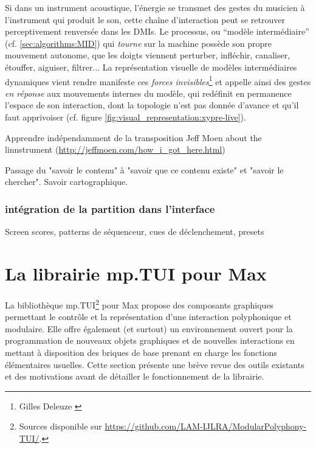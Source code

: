 \noindent Si dans un instrument acoustique, l'énergie se transmet des gestes du musicien à l'instrument qui produit le son, cette chaîne d'interaction peut se retrouver perceptivement renversée dans les \glspl{DMI}. Le processus, ou ``modèle intermédiaire'' (cf. \ref{sec:algorithms:MID}) qui \textit{tourne} sur la machine possède son propre mouvement autonome, que les doigts viennent perturber, infléchir, canaliser, étouffer, aiguiser, filtrer... La représentation visuelle de modèles intermédiaires dynamiques vient rendre manifeste ces \textit{forces invisibles}\footnote{ Gilles Deleuze \cite{deleuze_francis_1981}} et appelle ainsi des gestes \textit{en réponse} aux mouvements internes du modèle, qui redéfinit en permanence l'espace de son interaction, dont la topologie n'est pas donnée d'avance et qu'il faut apprivoiser (cf. figure \ref{fig:visual_representation:xypre-live}).

Apprendre indépendamment de la transposition
 Jeff Moen about the linnstrument (\url{http://jeffmoen.com/how_i_got_here.html})

Passage du "savoir le contenu" à "savoir que ce contenu existe" et "savoir le chercher".
Savoir cartographique.


\subsubsection{intégration de la partition dans l'interface}
Screen scores, patterns de séquenceur, cues de déclenchement, presets



\section{La librairie mp.TUI pour Max}


\noindent La bibliothèque mp.TUI\footnote{Sources disponible sur \url{https://github.com/LAM-IJLRA/ModularPolyphony-TUI/}.} pour Max propose des composants graphiques permettant le contrôle et la représentation d'une interaction polyphonique et modulaire. Elle offre également (et surtout) un environnement ouvert pour la programmation de nouveaux objets graphiques et de nouvelles interactions en mettant à disposition des briques de base prenant en charge les fonctions élémentaires usuelles. Cette section présente une brève revue des outils existants et des motivations avant de détailler le fonctionnement de la librairie.

